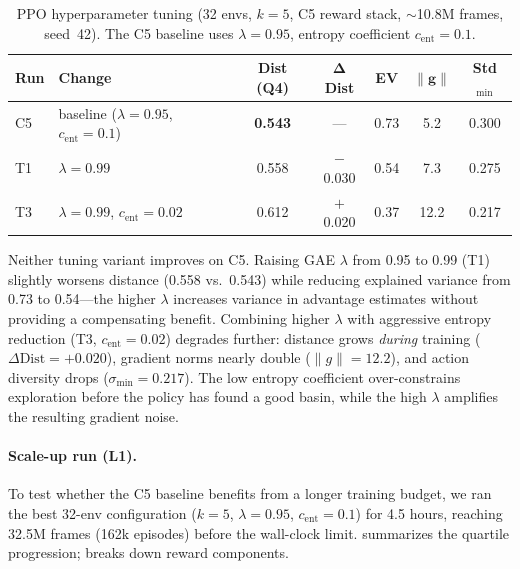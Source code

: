 \documentclass[11pt]{article}
\begin{document}
\begin{table}[H]
  \centering
  \small
  \renewcommand{\arraystretch}{1.3}
  \caption{PPO hyperparameter tuning (32 envs, $k{=}5$, C5 reward stack, ${\sim}$10.8M frames, seed~42). The C5 baseline uses $\lambda{=}0.95$, entropy coefficient $c_{\text{ent}}{=}0.1$.}
  \label{tab:ppo-tuning}
  \begin{tabular}{@{}llccccc@{}}
    \toprule
    \textbf{Run} & \textbf{Change} & \textbf{Dist (Q4)} & $\boldsymbol{\Delta}$\textbf{Dist} & \textbf{EV} & $\|\boldsymbol{g}\|$ & \textbf{Std$_{\min}$} \\
    \midrule
    C5 & baseline ($\lambda{=}0.95$, $c_{\text{ent}}{=}0.1$) & \textbf{0.543} & --- & 0.73 & 5.2 & 0.300 \\
    T1 & $\lambda{=}0.99$ & 0.558 & $-$0.030 & 0.54 & 7.3 & 0.275 \\
    T3 & $\lambda{=}0.99$, $c_{\text{ent}}{=}0.02$ & 0.612 & $+$0.020 & 0.37 & 12.2 & 0.217 \\
    \bottomrule
  \end{tabular}
\end{table}

\noindent
Neither tuning variant improves on C5.
Raising GAE $\lambda$ from 0.95 to 0.99 (T1) slightly worsens distance (0.558 vs.\ 0.543) while reducing explained variance from 0.73 to 0.54---the higher $\lambda$ increases variance in advantage estimates without providing a compensating benefit.
Combining higher $\lambda$ with aggressive entropy reduction (T3, $c_{\text{ent}}{=}0.02$) degrades further: distance grows \emph{during} training ($\Delta\text{Dist} = +0.020$), gradient norms nearly double ($\|g\| = 12.2$), and action diversity drops ($\sigma_{\min} = 0.217$).
The low entropy coefficient over-constrains exploration before the policy has found a good basin, while the high $\lambda$ amplifies the resulting gradient noise.

\paragraph{Scale-up run (L1).}
To test whether the C5 baseline benefits from a longer training budget, we ran the best 32-env configuration ($k{=}5$, $\lambda{=}0.95$, $c_{\text{ent}}{=}0.1$) for 4.5 hours, reaching 32.5M frames (162k episodes) before the wall-clock limit.
 summarizes the quartile progression;  breaks down reward components.
\end{document}
